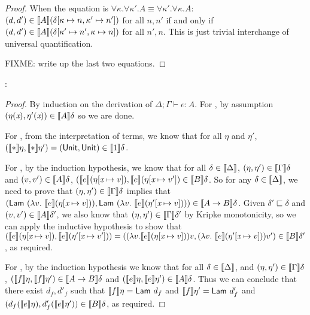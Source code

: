 \begin{proof}
  When the equation is $\forall \kappa. \forall \kappa'. A \equiv
  \forall \kappa'. \forall \kappa. A$: $(d,d') \in
  \llbracket A \rrbracket(\delta[\kappa \mapsto n, \kappa' \mapsto n'])$ for all
  $n,n'$ if and only if $(d,d') \in \llbracket A \rrbracket(\delta[\kappa' \mapsto n',
  \kappa \mapsto n])$ for all $n',n$. This is just trivial interchange
  of universal quantification.

  FIXME: write up the last two equations.
\end{proof}

:

\begin{proof}
  By induction on the derivation of $\Delta; \Gamma \vdash e : A$. For
  , by assumption $(\eta(\textit{x}),\eta'(\textit{x})) \in
  \llbracket A \rrbracket\delta$ so we are done.

  For , from the interpretation of terms, we know that
  for all $\eta$ and $\eta'$, $(\llbracket * \rrbracket\eta, \llbracket * \rrbracket\eta') =
  (\mathsf{Unit}, \mathsf{Unit}) \in \llbracket 1 \rrbracket\delta$.

  For , by the induction hypothesis, we know that for all
  $\delta \in \llbracket \Delta \rrbracket$, $(\eta,\eta') \in \llbracket \Gamma \rrbracket\delta$ and
  $(v,v') \in \llbracket A \rrbracket\delta$, $(\llbracket e \rrbracket(\eta[\textit{x} \mapsto v]),
  \llbracket e \rrbracket(\eta[\textit{x} \mapsto v']) \in \llbracket B \rrbracket\delta$. So for any
  $\delta \in \llbracket \Delta \rrbracket$, we need to prove that $(\eta,\eta') \in
  \llbracket \Gamma \rrbracket\delta$ implies that $(\mathsf{Lam}\ (\lambda v.\
  \llbracket e \rrbracket(\eta[\textit{x} \mapsto v])), \mathsf{Lam}\ (\lambda v.\
  \llbracket e \rrbracket(\eta'[\textit{x} \mapsto v]))) \in \llbracket A \to
    B \rrbracket\delta$. Given $\delta' \sqsubseteq \delta$ and $(v,v') \in
  \llbracket A \rrbracket\delta'$, we also know that $(\eta,\eta') \in
  \llbracket \Gamma \rrbracket\delta'$ by Kripke monotonicity, so we can apply the
  inductive hypothesis to show that $(\llbracket e \rrbracket(\eta[\textit{x} \mapsto
  v]), \llbracket e \rrbracket(\eta'[\textit{x} \mapsto v'])) = ((\lambda
  v. \llbracket e \rrbracket(\eta[\textit{x} \mapsto v]))v, (\lambda v.\
  \llbracket e \rrbracket(\eta'[\textit{x} \mapsto v]))v') \in \llbracket B \rrbracket\delta'$, as
  required.

  For \TirName{App}, by the induction hypothesis we know that for all
  $\delta \in \llbracket \Delta \rrbracket$, and $(\eta, \eta') \in
  \llbracket \Gamma \rrbracket\delta$, $(\llbracket f \rrbracket\eta, \llbracket f \rrbracket\eta') \in \llbracket A \to
    B \rrbracket\delta$ and $(\llbracket e \rrbracket\eta, \llbracket e \rrbracket\eta') \in
  \llbracket A \rrbracket\delta$. Thus we can conclude that there exist $d_f, d'_f$
  such that $\sem{f}\eta = \semCons{Lam}\ d_f$ and $\llbracket f \rrbracket\eta' =
  \mathsf{Lam}\ d'_f$ and $(d_f(\llbracket e \rrbracket\eta), d'_f(\llbracket e \rrbracket\eta')) \in
  \llbracket B \rrbracket\delta$, as required.


\end{proof}
